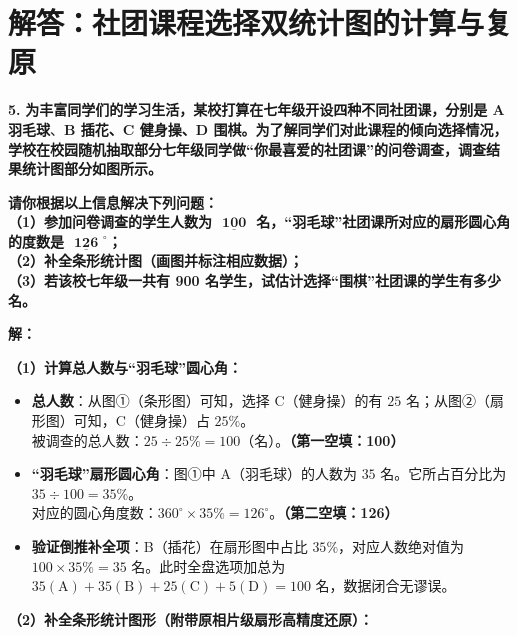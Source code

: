 \newpage



\section{解答：社团课程选择双统计图的计算与复原}

\vspace{0.6cm}

\textbf{\LARGE 5.} \textbf{为丰富同学们的学习生活，某校打算在七年级开设四种不同社团课，分别是 A 羽毛球$、$B 插花、C 健身操、D 围棋。为了解同学们对此课程的倾向选择情况，学校在校园随机抽取部分七年级同学做“你最喜爱的社团课”的问卷调查，调查结果统计图部分如图所示。}

\textbf{请你根据以上信息解决下列问题：\\
（1）参加问卷调查的学生人数为 $\underline{\textbf{    100    }}$ 名，“羽毛球”社团课所对应的扇形圆心角的度数是 $\underline{\textbf{  126  }}^\circ$；\\
（2）补全条形统计图（画图并标注相应数据）；\\
（3）若该校七年级一共有 900 名学生，试估计选择“围棋”社团课的学生有多少名。}

\vspace{0.4cm}
\textbf{解：}

\textbf{（1）计算总人数与“羽毛球”圆心角：}
\begin{itemize}
    \item \textbf{总人数}：从图①（条形图）可知，选择 C（健身操）的有 $25$ 名；从图②（扇形图）可知，C（健身操）占 $25\%$。\\
    被调查的总人数：$25 \div 25\% = 100$（名）。\textbf{（第一空填：100）}
    \item \textbf{“羽毛球”扇形圆心角}：图①中 A（羽毛球）的人数为 $35$ 名。它所占百分比为 $35 \div 100 = 35\%$。\\
    对应的圆心角度数：$360^\circ \times 35\% = 126^\circ$。\textbf{（第二空填：126）}
    \item \textbf{验证倒推补全项}：B（插花）在扇形图中占比 $35\%$，对应人数绝对值为 $100 \times 35\% = 35$ 名。此时全盘选项加总为 $35(\text{A}) + 35(\text{B}) + 25(\text{C}) + 5(\text{D}) = 100$ 名，数据闭合无谬误。
\end{itemize}

\textbf{（2）补全条形统计图形（附带原相片级扇形高精度还原）：}

